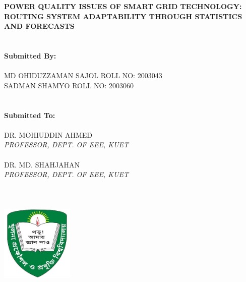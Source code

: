 \documentclass[a4paper,12pt,oneside]{book}
\newcommand{\blanklineR}{\hfill \\} %
\newcommand{\HeadingR}[1]{
{\large		
\bfseries{#1}}}
\newcommand{\titleR}{Power Quality Issues of Smart Grid Technology: Routing System 
Adaptability through Statistics and Forecasts}
\begin{document}
\frontmatter
\begin{titlepage}
{}	
\centering
\HeadingR{\MakeUppercase{\titleR}}
\blanklineR\blanklineR\blanklineR
{\fontsize{16}{12}\selectfont \textbf{Submitted By:}}\\
\blanklineR
{\fontsize{14}{12}\selectfont \MakeUppercase{MD OHIDUZZAMAN SAJOL}      \hspace{1.15cm}     \MakeUppercase{ROLL NO: 2003043}}
\blanklineR
{\fontsize{14}{12}\selectfont \MakeUppercase{SADMAN SHAMYO}      \hspace{1.15cm}     \MakeUppercase{ROLL NO: 2003060}}
\blanklineR\blanklineR\blanklineR
{\fontsize{16}{12}\selectfont \textbf{Submitted To:}}\\
\blanklineR
{\fontsize{14}{12}\selectfont \MakeUppercase{Dr. MOHIUDDIN AHMED}\\
\MakeUppercase{\textit{PROFESSOR, DEPT. OF EEE, KUET}}}\\
\blanklineR
{\fontsize{14}{12}\selectfont \MakeUppercase{Dr. MD. SHAHJAHAN}\\
\MakeUppercase{\textit{PROFESSOR, DEPT. OF EEE, KUET}}}\\
\blanklineR\blanklineR\blanklineR
\includegraphics[width=0.26\textwidth]{Figures/kuet_logo.jpg}
\blanklineR\blanklineR\blanklineR
\end{titlepage}


\newpage
{} \label{abstr}
\end{document}
